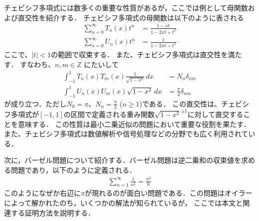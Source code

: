 \documentclass[a4paper,10pt]{ltjsarticle}
\begin{document}
\begin{multicols}{2}
チェビシフ多項式には数多くの重要な性質があるが，ここでは例として母関数および直交性を紹介する．
チェビシフ多項式の母関数は以下のように表される
\begin{align*}
    \sum_{n=0}^{\infty} T_n(x) t^n &= \frac{1 - xt}{1 - 2xt + t^2} \\
    \sum_{n=0}^{\infty} U_n(x) t^n &= \frac{1}{1 - 2xt + t^2}
\end{align*}
ここで、$|t|<1$の範囲で収束する．
また、チェビシフ多項式は直交性を満たす．
すなわち、$n, m \in \mathbb{Z}$ にたいして
\begin{align*}
    \int_{-1}^{1} T_n(x) T_m(x)\frac{1}{\sqrt{1-x^2}} \, dx &= N_{n}\delta_{nm} \\
    \int_{-1}^{1}  U_n(x) U_m(x) \sqrt{1-x^2} \, dx &= \frac{\pi}{2} \delta_{nm} 
\end{align*}
が成り立つ．ただし$N_0=\pi$、$N_n = \frac{\pi}{2}$ ($n \ge 1$)である．
この直交性は、チェビシフ多項式が$[-1, 1]$の区間で定義される重み関数$\sqrt{1-x^2}^{\pm 1}$に対して直交することを意味する．
この性質は最小二乗近似の問題において重要な役割を果たす．
また、チェビシフ多項式は数値解析や信号処理などの分野でも広く利用されている．

次に，バーゼル問題について紹介する．バーゼル問題は逆二乗和の収束値を求める問題であり，以下のように定義される．
\begin{align*}
    \sum_{n=1}^{\infty} \frac{1}{n^2} = \frac{\pi^2}{6}
\end{align*}
このようになぜか右辺に$\pi$が現れるのが面白い問題である．この問題はオイラーによって解かれたのち，いくつかの解法が知られているが，
ここでは本文と関連する証明方法を説明する．


\end{multicols}
\end{document}
